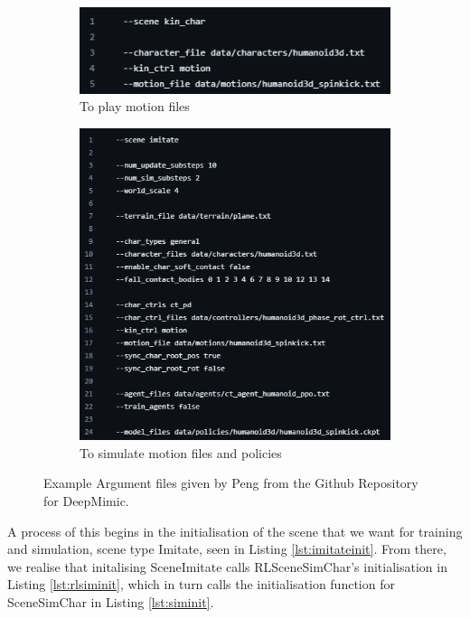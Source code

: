 \documentclass{l4proj}
\begin{document}
\begin{figure}[htb]
  \centering
  \begin{subfigure}[b]{0.45\textwidth}
    \includegraphics[width=\textwidth]{images/deepmimic_play_args.png}
    \caption{To play motion files}
    \label{fig:argfiles1}
  \end{subfigure}
  \begin{subfigure}[b]{0.45\textwidth}
    \includegraphics[width=\textwidth]{images/deepmimic_simulate_args.png}
    \caption{To simulate motion files and policies}
    \label{fig:argfiles2}
  \end{subfigure}
  \caption{Example Argument files given by Peng from the Github Repository for DeepMimic.}
  \label{fig:argfiles}
\end{figure}

A process of this begins in the initialisation of the scene that we want for training and simulation, scene type Imitate, seen in Listing \ref{lst:imitateinit}. From there, we realise that initalising SceneImitate calls RLSceneSimChar's initialisation in Listing \ref{lst:rlsiminit}, which in turn calls the initialisation function for SceneSimChar in Listing \ref{lst:siminit}.
\end{document}
